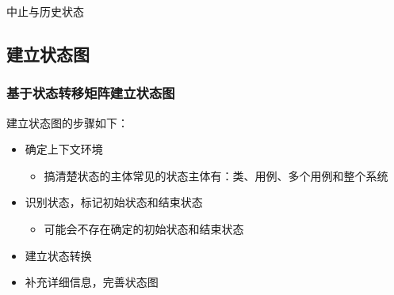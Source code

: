 中止与历史状态
\begin{figure}[H]
	\setcounter{subfigure}{0}
	\centering
	\vspace{-0.5em}	
	\centering
	\vspace{-1em}
\end{figure}


\subsection{建立状态图}

\subsubsection{基于状态转移矩阵建立状态图}
建立状态图的步骤如下：
\begin{itemize}
    \item 确定上下文环境
    \begin{itemize}
        \item 搞清楚状态的主体常见的状态主体有：类、用例、多个用例和整个系统
    \end{itemize}
    \item 识别状态，标记初始状态和结束状态
    \begin{itemize}
        \item 可能会不存在确定的初始状态和结束状态 
    \end{itemize} 
    \item 建立状态转换  
    \item 补充详细信息，完善状态图 
\end{itemize}

